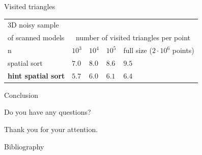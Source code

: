 \documentclass{beamer}
\begin{document}
\begin{frame}{Visited triangles}
\begin{tabular}{|l||l|l|l|l|}
\hline
3D noisy sample \\
of scanned models& \multicolumn{4}{|c|}{number of visited triangles per point}\\
 \hline \hline
    n & $10^3$ & $10^4$ & $10^5$ & full size ($2 \cdot 10^6$ points)\\\hline
    spatial sort & $7.0$ & $8.0$ & $8.6$ & $9.5$\\\hline
    \textbf{hint spatial sort} & $5.7$ & $6.0$ & $6.1$ & $6.4$\\\hline
\end{tabular}
\end{frame}

\begin{frame}{Conclusion}
\begin{block}

\end{block}
\end{frame}

\begin{frame}
\centering
\huge{Do you have any questions?}\\
\pause
\vspace*{1.5cm}
\centerline{\large{Thank you for your attention.}}
\end{frame}

\begin{frame}{Bibliography}
  
\nocite{*}

\end{frame}
\end{document}
